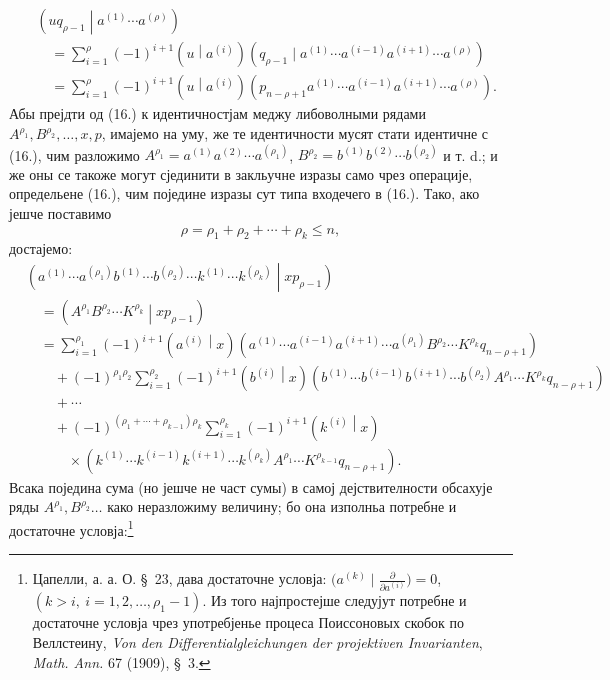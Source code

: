 ﻿\documentclass[11pt]{article}
\newcommand{\pair}[2]{\left(#1\middle|#2\right)}
\begin{document}
\begin{equation}
\begin{aligned}
&\pair{u q_{\rho-1}}{a^{(1)}\cdots a^{(\rho)}}\\
&\quad=\sum_{i=1}^{\rho}(-1)^{i+1}\pair{u}{a^{(i)}}
(q_{\rho-1}\mid a^{(1)}\cdots a^{(i-1)}a^{(i+1)}\cdots a^{(\rho)})\\
&\quad=\sum_{i=1}^{\rho}(-1)^{i+1}\pair{u}{a^{(i)}}
(p_{n-\rho+1}a^{(1)}\cdots a^{(i-1)}a^{(i+1)}\cdots a^{(\rho)}).
\end{aligned}
\tag{17}
\end{equation}
Абы прејдти од (16.) к идентичностјам меджу либоволными рядами $A^{\rho_1},B^{\rho_2},\ldots,x,p$, имајемо на уму, же те идентичности мусят стати идентичне с (16.), чим разложимо $A^{\rho_1}=a^{(1)}a^{(2)}\cdots a^{(\rho_1)}$, $B^{\rho_2}=b^{(1)}b^{(2)}\cdots b^{(\rho_2)}$ и т. d.; и же оны се такоже могут сјединити в закльучне изразы само чрез операције, определьене (16.), чим поједине изразы сут типа входечего в (16.). Тако, ако јешче поставимо
\begin{equation}
 \rho=\rho_1+\rho_2+\cdots+\rho_k\le n,
\tag{18}
\end{equation}
достајемо:
\[
\begin{aligned}
&\pair{a^{(1)}\cdots a^{(\rho_1)}b^{(1)}\cdots b^{(\rho_2)}
\cdots k^{(1)}\cdots k^{(\rho_k)}}{xp_{\rho-1}}\\
&\quad=\pair{A^{\rho_1}B^{\rho_2}\cdots K^{\rho_k}}{xp_{\rho-1}} \\
&\quad=\sum_{i=1}^{\rho_1}(-1)^{i+1}\pair{a^{(i)}}{x}
(a^{(1)}\cdots a^{(i-1)}a^{(i+1)}\cdots a^{(\rho_1)}
B^{\rho_2}\cdots K^{\rho_k}q_{n-\rho+1})\\
&\qquad+(-1)^{\rho_1\rho_2}\sum_{i=1}^{\rho_2}(-1)^{i+1}\pair{b^{(i)}}{x}
(b^{(1)}\cdots b^{(i-1)}b^{(i+1)}\cdots b^{(\rho_2)}
A^{\rho_1}\cdots K^{\rho_k}q_{n-\rho+1})\\
&\qquad+\cdots\\
&\qquad+(-1)^{(\rho_1+\cdots+\rho_{k-1})\rho_k}
\sum_{i=1}^{\rho_k}(-1)^{i+1}\pair{k^{(i)}}{x}\\
&\qquad\quad\times
(k^{(1)}\cdots k^{(i-1)}k^{(i+1)}\cdots k^{(\rho_k)}
A^{\rho_1}\cdots K^{\rho_{k-1}}q_{n-\rho+1}).
\end{aligned}
\]
Всака поједина сума (но јешче не част сумы) в самој дејствителности обсахује ряды $A^{\rho_1},B^{\rho_2}\ldots$ како неразложиму величину; бо она изполньа потребне и достаточне условја:\footnote{Цапелли, а. а. О. \S\ 23, дава достаточне условја: $\bigl(a^{(k)}\mid \frac{\partial}{\partial a^{(i)}}\bigr)=0$, $(k>i,\ i=1,2,\ldots,\rho_1-1)$. Из того најпростејше следујут потребне и достаточне условја чрез употребјенье процеса Поиссоновых скобок по Веллстеину, \emph{Von den Differentialgleichungen der projektiven Invarianten}, \emph{Math. Ann.} 67 (1909), \S\ 3.}
\end{document}
